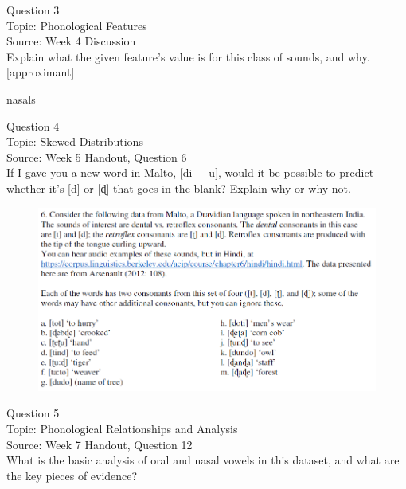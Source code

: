 \documentclass[12pt]{article}
\begin{document}
\newpage

{\large Question 3}\\

Topic: Phonological Features\\
Source: Week 4 Discussion\\

Explain what the given feature’s value is for this class of sounds, and why.\\

{[approximant]}

nasals


\newpage

{\large Question 4}\\

Topic: Skewed Distributions\\
Source: Week 5 Handout, Question 6\\

If I gave you a new word in Malto, [di\_\_u], would it be possible to predict whether it's [d] or [ɖ] that goes in the blank? Explain why or why not.\\

\begin{figure}[H]
\includegraphics{../images/malto.png}
\end{figure}

\newpage

{\large Question 5}\\

Topic: Phonological Relationships and Analysis\\
Source: Week 7 Handout, Question 12\\

What is the basic analysis of oral and nasal vowels in this dataset, and what are the key pieces of evidence?\\
\end{document}
